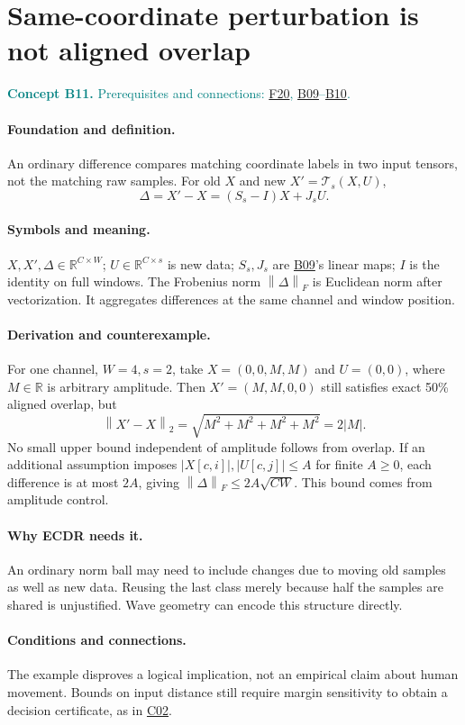 \documentclass[11pt,a4paper]{article}
\newcommand{\R}{\mathbb R}
\newcommand{\norm}[1]{\left\lVert#1\right\rVert}
\newcommand{\conceptid}{Front matter}
\newcommand{\concept}[3]{\clearpage\renewcommand{\conceptid}{#1}%
\section{#2}\label{concept:#1}%
\textcolor{teal}{\textbf{Concept #1.} Prerequisites and connections: #3.}\par
\typeout{ECDR-CONCEPT-START #1 PAGE=\thepage}}
\begin{document}
\concept{B11}{Same-coordinate perturbation is not aligned overlap}{\hyperref[concept:F20]{F20}, \hyperref[concept:B09]{B09}--\hyperref[concept:B10]{B10}}
\paragraph{Foundation and definition.}
An ordinary difference compares matching coordinate labels in two input
tensors, not the matching raw samples. For old $X$ and new
$X'=\mathcal T_s(X,U)$,
\[
 \Delta=X'-X=(S_s-I)X+J_sU.
\]
\paragraph{Symbols and meaning.}
$X,X',\Delta\in\R^{C\times W}$; $U\in\R^{C\times s}$ is new data;
$S_s,J_s$ are \hyperref[concept:B09]{B09}'s linear maps; $I$ is the identity on full windows.
The Frobenius norm $\norm{\Delta}_F$ is Euclidean norm after vectorization.
It aggregates differences at the same channel and window position.
\paragraph{Derivation and counterexample.}
For one channel, $W=4,s=2$, take $X=(0,0,M,M)$ and $U=(0,0)$, where
$M\in\R$ is arbitrary amplitude. Then $X'=(M,M,0,0)$ still satisfies exact
50\% aligned overlap, but
\[
 \norm{X'-X}_2=\sqrt{M^2+M^2+M^2+M^2}=2|M|.
\]
No small upper bound independent of amplitude follows from overlap. If an
additional assumption imposes $|X[c,i]|,|U[c,j]|\le A$ for finite $A\ge0$,
each difference is at most $2A$, giving
$\norm{\Delta}_F\le2A\sqrt{CW}$. This bound comes from amplitude control.
\paragraph{Why ECDR needs it.}
An ordinary norm ball may need to include changes due to moving old samples
as well as new data. Reusing the last class merely because half the samples
are shared is unjustified. Wave geometry can encode this structure directly.
\paragraph{Conditions and connections.}
The example disproves a logical implication, not an empirical claim about
human movement. Bounds on input distance still require margin sensitivity
to obtain a decision certificate, as in \hyperref[concept:C02]{C02}.
\par\label{endconcept:B11}
\end{document}
